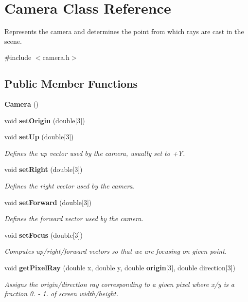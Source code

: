 \section{Camera Class Reference}
\label{class_camera}


Represents the camera and determines the point from which rays are cast in the scene.  




{\ttfamily \#include $<$camera.\+h$>$}

\subsection*{Public Member Functions}
\begin{DoxyCompactItemize}
\item 
{\bf Camera} ()
\item 
void {\bf set\+Origin} (double[3])
\item 
void {\bf set\+Up} (double[3])
\begin{DoxyCompactList}\small\item\em Defines the up vector used by the camera, usually set to +\+Y. \end{DoxyCompactList}\item 
void {\bf set\+Right} (double[3])
\begin{DoxyCompactList}\small\item\em Defines the right vector used by the camera. \end{DoxyCompactList}\item 
void {\bf set\+Forward} (double[3])
\begin{DoxyCompactList}\small\item\em Defines the forward vector used by the camera. \end{DoxyCompactList}\item 
void {\bf set\+Focus} (double[3])
\begin{DoxyCompactList}\small\item\em Computes up/right/forward vectors so that we are focusing on given point. \end{DoxyCompactList}\item 
void {\bf get\+Pixel\+Ray} (double x, double y, double {\bf origin}[3], double direction[3])
\begin{DoxyCompactList}\small\item\em Assigns the origin/direction ray corresponding to a given pixel where x/y is a fraction 0. -\/ 1. of screen width/height. \end{DoxyCompactList}\end{DoxyCompactItemize}
